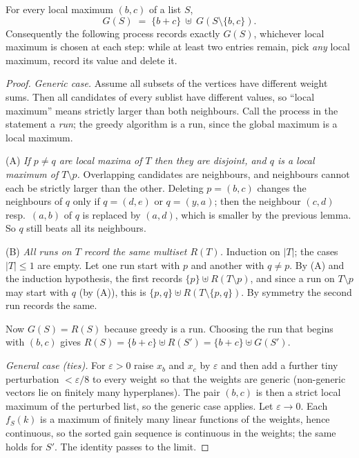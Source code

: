 \documentclass[11pt]{article}
\begin{document}
\begin{theorembox}[Peeling]
For every local maximum $(b,c)$ of a list $S$,
\[ G(S)\;=\;\{b+c\}\ \uplus\ G(S\setminus\{b,c\}) . \]
Consequently the following process records exactly $G(S)$, whichever local
maximum is chosen at each step: while at least two entries remain, pick
\emph{any} local maximum, record its value and delete it.
\end{theorembox}
\begin{proof}
\emph{Generic case.} Assume all subsets of the vertices have different
weight sums. Then all candidates of every sublist have different values, so
``local maximum'' means strictly larger than both neighbours. Call the
process in the statement a \emph{run}; the greedy algorithm is a run, since the
global maximum is a local maximum.

(A) \emph{If $p\ne q$ are local maxima of $T$ then they are disjoint, and $q$
is a local maximum of $T\setminus p$.} Overlapping candidates are neighbours,
and neighbours cannot each be strictly larger than the other. Deleting
$p=(b,c)$ changes the neighbours of $q$ only if $q=(d,e)$ or $q=(y,a)$; then
the neighbour $(c,d)$ resp.\ $(a,b)$ of $q$ is replaced by $(a,d)$, which is
smaller by the previous lemma. So $q$ still beats all its neighbours.

(B) \emph{All runs on $T$ record the same multiset $R(T)$.} Induction on
$|T|$; the cases $|T|\le1$ are empty. Let one run start with $p$ and another
with $q\ne p$. By (A) and the induction hypothesis, the first records
$\{p\}\uplus R(T\setminus p)$, and since a run on $T\setminus p$ may
start with $q$ (by (A)), this is $\{p,q\}\uplus R(T\setminus\{p,q\})$. By
symmetry the second run records the same.

Now $G(S)=R(S)$ because greedy is a run. Choosing the run that begins with
$(b,c)$ gives $R(S)=\{b+c\}\uplus R(S')=\{b+c\}\uplus G(S')$.

\emph{General case (ties).} For $\varepsilon>0$ raise $x_b$ and $x_c$ by
$\varepsilon$ and then add a further tiny perturbation $<\varepsilon/8$ to
every weight so that the weights are generic (non-generic vectors lie on
finitely many hyperplanes). The pair $(b,c)$ is then a strict local maximum of
the perturbed list, so the generic case applies. Let $\varepsilon\to0$. Each
$f_S(k)$ is a maximum of finitely many linear functions of the weights,
hence continuous, so the sorted gain sequence is continuous in the weights;
the same holds for $S'$. The identity passes to the limit.
\end{proof}
\end{document}
